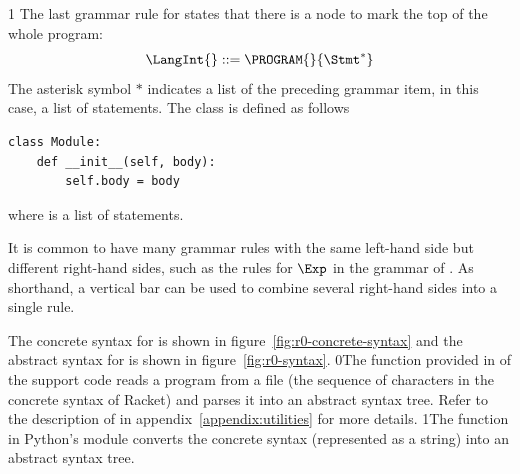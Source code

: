 \documentclass[7x10]{TimesAPriori_MIT}%
\def\racketEd{0}
\def\pythonEd{1}
\def\edition{1}
\newcommand{\racket}[1]{{\if\edition\racketEd{#1}\fi}}
\newcommand{\pythonColor}[0]{}
\newcommand{\python}[1]{{\if\edition\pythonEd\pythonColor #1\fi}}
\numberwithin{theorem}{chapter}
\numberwithin{definition}{chapter}
\numberwithin{equation}{chapter}
\begin{document}
{\if\edition\pythonEd\pythonColor
The last grammar rule for \LangInt{} states that there is a
 node to mark the top of the whole program:
\[
  \LangInt{} ::= \PROGRAM{}{\Stmt^{*}}
\]
The asterisk symbol $*$ indicates a list of the preceding grammar item, in
this case, a list of statements.
%
The  class is defined as follows
\begin{lstlisting}
class Module:
    def __init__(self, body):
        self.body = body
\end{lstlisting}
where  is a list of statements.
\fi}

It is common to have many grammar rules with the same left-hand side
but different right-hand sides, such as the rules for $\Exp$ in the
grammar of \LangInt{}. As shorthand, a vertical bar can be used to
combine several right-hand sides into a single rule.

The concrete syntax for \LangInt{} is shown in
figure~\ref{fig:r0-concrete-syntax} and the abstract syntax for
\LangInt{} is shown in figure~\ref{fig:r0-syntax}.%
%
\racket{The  function provided in
  \code{utilities.rkt} of the support code reads a program from a file
  (the sequence of characters in the concrete syntax of Racket) and
  parses it into an abstract syntax tree. Refer to the description of
  \code{read-program} in appendix~\ref{appendix:utilities} for more
  details.}
%
\python{The  function in Python's  module
  converts the concrete syntax (represented as a string) into an
  abstract syntax tree.}

\newcommand{\LintGrammarRacket}{
  \begin{array}{rcl}
    \Type &::=& \key{Integer} \\
    \Exp{} &::=& \Int{} \MID \CREAD \MID \CNEG{\Exp} \MID \CADD{\Exp}{\Exp}
      \MID \CSUB{\Exp}{\Exp}
  \end{array}
}
\newcommand{\LintASTRacket}{
  \begin{array}{rcl}
    \Type &::=& \key{Integer} \\
    \Exp{} &::=& \INT{\Int} \MID \READ{} \\
           &\MID& \NEG{\Exp} \MID \ADD{\Exp}{\Exp} \MID \SUB{\Exp}{\Exp}
  \end{array}
}
\newcommand{\LintGrammarPython}{
\begin{array}{rcl}
  \Exp &::=& \Int \MID \key{input\_int}\LP\RP \MID \key{-}\;\Exp \MID \Exp \; \key{+} \; \Exp \MID \Exp \; \key{-} \; \Exp \MID \LP\Exp\RP \\
  \Stmt &::=& \key{print}\LP \Exp \RP \MID \Exp
\end{array}
}
\newcommand{\LintASTPython}{
  \begin{array}{rcl}
  \itm{binaryop} &::= & \code{Add()} \MID \code{Sub()} \\
  \itm{unaryop} &::= & \code{USub()} \\
  \Exp{} &::=& \INT{\Int} \MID \READ{} \\
        &\MID& \UNIOP{\itm{unaryop}}{\Exp} \MID  \BINOP{\Exp}{\itm{binaryop}}{\Exp}  \\
  \Stmt{} &::=& \PRINT{\Exp} \MID \EXPR{\Exp} 
\end{array}
}
\end{document}
